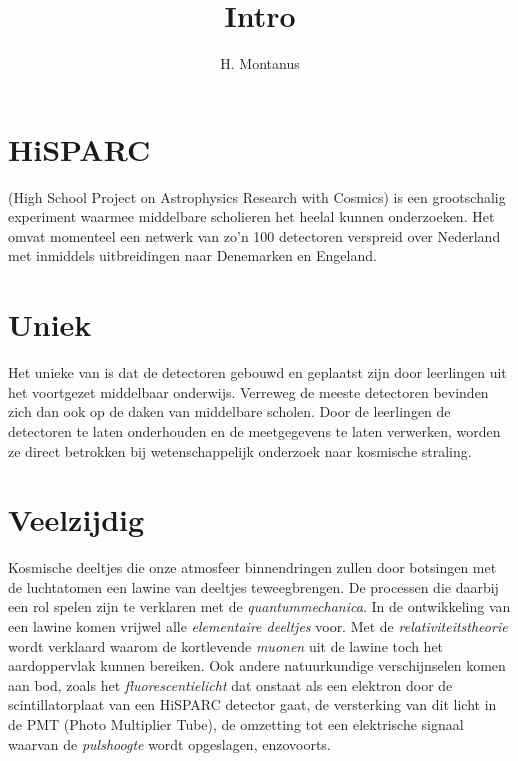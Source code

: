 



\title{Intro}
\author{H. Montanus}
\date{}

\maketitle


\section{HiSPARC}

\hisparc (High School Project on Astrophysics Research with Cosmics) is
een grootschalig experiment waarmee middelbare scholieren het heelal
kunnen onderzoeken. Het omvat momenteel een netwerk van zo'n 100
detectoren verspreid over Nederland met inmiddels uitbreidingen naar
Denemarken en Engeland. 


\section{Uniek}

Het unieke van \hisparc is dat de detectoren gebouwd en geplaatst zijn
door leerlingen uit het voortgezet middelbaar onderwijs. Verreweg de
meeste detectoren bevinden zich dan ook op de daken van middelbare
scholen. Door de leerlingen de detectoren te laten onderhouden en de
meetgegevens te laten verwerken, worden ze direct betrokken bij
wetenschappelijk onderzoek naar kosmische straling. 


\section{Veelzijdig}

Kosmische deeltjes die onze atmosfeer binnendringen zullen door
botsingen met de luchtatomen een lawine van deeltjes teweegbrengen. De
processen die daarbij een rol spelen zijn te verklaren met de
\emph{quantummechanica}. In de ontwikkeling van een lawine komen vrijwel
alle \emph{elementaire deeltjes} voor. Met de
\emph{relativiteitstheorie} wordt verklaard waarom de kortlevende
\emph{muonen} uit de lawine toch het aardoppervlak kunnen bereiken. Ook
andere natuurkundige verschijnselen komen aan bod, zoals het
\emph{fluorescentielicht} dat onstaat als een elektron door de
scintillatorplaat van een HiSPARC detector gaat, de versterking van dit
licht in de PMT (Photo Multiplier Tube), de omzetting tot een
elektrische signaal waarvan de \emph{pulshoogte} wordt opgeslagen,
enzovoorts.      


